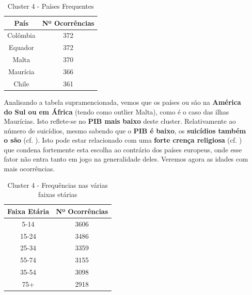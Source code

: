 \documentclass[a4paper,12pt]{article}
\begin{document}
\begin{table}[H]
	\centering
	\caption{Cluster 4 - Países Frequentes}
	\begin{tabular}{|c|c|} 
		\hline
		\rowcolor[rgb]{0.678,1,0.851} País & Nº Ocorrências  \\ 
		\hline
		Colômbia                           & 372             \\ 
		\hline
		Equador                            & 372             \\ 
		\hline
		Malta                              & 370             \\ 
		\hline
		Maurícia                           & 366             \\ 
		\hline
		Chile                              & 361             \\
		\hline
	\end{tabular}
\end{table}

Analisando a tabela supramencionada, vemos que os países ou são na \textbf{América do Sul ou em África} (tendo como outlier Malta), como é o caso das ilhas Maurícias. Isto reflete-se no \textbf{PIB mais baixo} deste cluster. Relativamente ao número de suicídios, mesmo sabendo que o \textbf{PIB é baixo}, os \textbf{suicídios também o são} (cf. \cite{suicidiosamericasul}). Isto pode estar relacionado com uma \textbf{forte crença religiosa} (cf. \cite{religiosos}) que condena fortemente esta escolha ao contrário dos países europeus, onde esse fator não entra tanto em jogo na generalidade deles. Veremos agora as idades com mais ocorrências.


\begin{table}[H]
	\centering
	\caption{Cluster 4 - Frequências nas várias faixas etárias}
	\begin{tabular}{|c|c|} 
		\hline
		\rowcolor[rgb]{0.678,1,0.851} Faixa Etária & Nº Ocorrências  \\ 
		\hline
		5-14                                       & 3606            \\ 
		\hline
		15-24                                      & 3486            \\ 
		\hline
		25-34                                      & 3359            \\ 
		\hline
		55-74                                      & 3155            \\ 
		\hline
		35-54                                      & 3098            \\ 
		\hline
		75+                                        & 2918            \\
		\hline
	\end{tabular}
\end{table}
\end{document}
